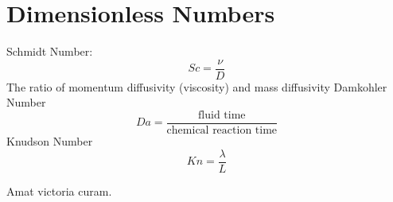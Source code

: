 \documentclass{article}
\begin{document}
%
%
\newpage
\section{Dimensionless Numbers}
Schmidt Number:
\begin{equation}
  Sc = \frac{\nu}{D}
\end{equation}
The ratio of momentum diffusivity (viscosity) and mass diffusivity
\newline
\newline
Damkohler Number
\begin{equation}
  Da = \frac{\textrm{fluid time}}{\textrm{chemical reaction time}}
\end{equation}
\newline
\newline
Knudson Number
\begin{equation}
  Kn = \frac{\lambda}{L}
\end{equation}

\newpage
Amat victoria curam. 
\end{document}
